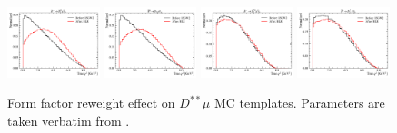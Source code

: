 \begin{figure}[ht]
    \includegraphics[width=0.24\textwidth]{
        ./figs-supplemental-plots/Dstst-form-factors/DststMu/D1stst0Mu.pdf
    }
    \includegraphics[width=0.24\textwidth]{
        ./figs-supplemental-plots/Dstst-form-factors/DststMu/D1ststMu.pdf
    }
    \includegraphics[width=0.24\textwidth]{
        ./figs-supplemental-plots/Dstst-form-factors/DststMu/D2stst0Mu.pdf
    }
    \includegraphics[width=0.24\textwidth]{
        ./figs-supplemental-plots/Dstst-form-factors/DststMu/D2ststMu.pdf
    }

    \caption{
        Form factor reweight effect on $D^{**}\mu$ MC templates.
        Parameters are taken verbatim from \cite{Bernlochner_2018}.
    }
    \label{fig:ff-rwt-raw-Dstst-norm-like}
\end{figure}

